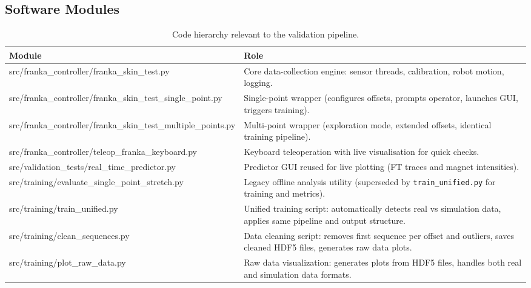 \documentclass[11pt,a4paper]{article}
\begin{document}
\subsection{Software Modules}
\begin{table}[H]
    \centering
    \renewcommand{\arraystretch}{1.2}
    \caption{Code hierarchy relevant to the validation pipeline.}
    \begin{tabularx}{\linewidth}{@{}>{\raggedright\arraybackslash\ttfamily\footnotesize}p{7cm}X@{}}
        \toprule
        Module & Role \\
        \midrule
        src/franka\_controller/\newline franka\_skin\_test.py &
        Core data-collection engine: sensor threads, calibration, robot motion, logging. \\
        src/franka\_controller/\newline franka\_skin\_test\_single\_point.py &
        Single-point wrapper (configures offsets, prompts operator, launches GUI, triggers training). \\
        src/franka\_controller/\newline franka\_skin\_test\_multiple\_points.py &
        Multi-point wrapper (exploration mode, extended offsets, identical training pipeline). \\
        src/franka\_controller/\newline teleop\_franka\_keyboard.py &
        Keyboard teleoperation with live visualisation for quick checks. \\
        src/validation\_tests/\newline real\_time\_predictor.py &
        Predictor GUI reused for live plotting (FT traces and magnet intensities). \\
        src/training/\newline evaluate\_single\_point\_stretch.py &
        Legacy offline analysis utility (superseded by \texttt{train\_unified.py} for training and metrics). \\
        src/training/\newline train\_unified.py &
        Unified training script: automatically detects real vs simulation data, applies same pipeline and output structure. \\
        src/training/\newline clean\_sequences.py &
        Data cleaning script: removes first sequence per offset and outliers, saves cleaned HDF5 files, generates raw data plots. \\
        src/training/\newline plot\_raw\_data.py &
        Raw data visualization: generates plots from HDF5 files, handles both real and simulation data formats. \\
        \bottomrule
    \end{tabularx}
\end{table}
\end{document}
